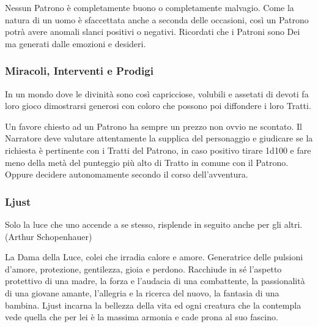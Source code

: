 \begin{multicols}{2}
\medskip

Nessun Patrono è completamente buono o completamente malvagio. Come la natura di un uomo è sfaccettata anche a seconda delle occasioni, così un Patrono potrà avere anomali slanci positivi o negativi. Ricordati che i Patroni sono Dei ma generati dalle emozioni e desideri.

\subsubsection{Miracoli, Interventi e Prodigi}

In un mondo dove le divinità sono così capricciose, volubili e assetati di devoti fa loro gioco dimostrarsi generosi con coloro che possono poi diffondere i loro Tratti.

Un favore chiesto ad un Patrono ha sempre un prezzo non ovvio ne scontato. Il Narratore deve valutare attentamente la supplica del personaggio e giudicare se la richiesta è pertinente con i Tratti del Patrono, in caso positivo tirare 1d100 e fare meno della metà del punteggio più alto di Tratto in comune con il Patrono. Oppure decidere autonomamente secondo il corso dell'avventura.



\subsubsection{Ljust}\label{ljust}\hypertarget{ljust}{}


\begin{enfasi}{
Solo la luce che uno accende a se stesso, risplende in seguito anche per gli altri. (Arthur Schopenhauer)
}\end{enfasi}


La Dama della Luce, colei che irradia calore e amore. Generatrice delle pulsioni d'amore, protezione, gentilezza, gioia e perdono. Racchiude in sé l'aspetto protettivo di una madre, la forza e l'audacia di una combattente, la passionalità di una giovane amante, l'allegria e la ricerca del nuovo, la fantasia di una bambina. Ljust incarna la bellezza della vita ed ogni creatura che la contempla vede quella che per lei è la massima armonia e cade prona al suo fascino.


\end{multicols}
